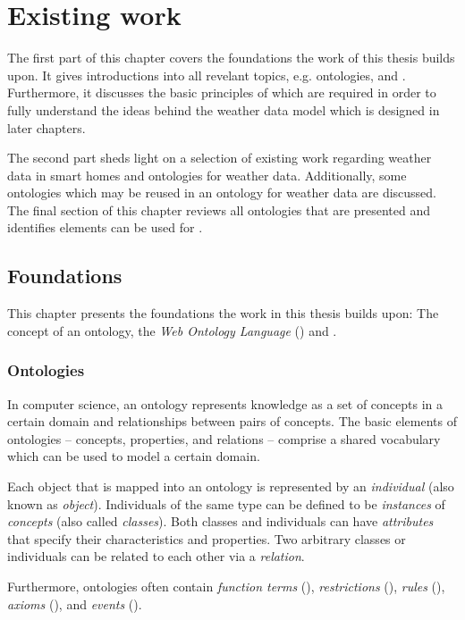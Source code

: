 \chapter{Existing work}
\label{ch:existing_work}

The first part of this chapter covers the foundations the work of this thesis builds upon. It gives introductions into all revelant topics, e.g. ontologies,  and . Furthermore, it discusses the basic principles of \thinkhome which are required in order to fully understand the ideas behind the weather data model which is designed in later chapters.

The second part sheds light on a selection of existing work regarding weather data in smart homes and ontologies for weather data. Additionally, some ontologies which may be reused in an ontology for weather data are discussed. The final section of this chapter reviews all ontologies that are presented and identifies elements can be used for \thinkhome.

\section{Foundations}

This chapter presents the foundations the work in this thesis builds upon: The concept of an ontology, the \emph{Web Ontology Language} () and \thinkhome.

\subsection{Ontologies}

In computer science, an ontology represents knowledge as a set of concepts in a certain domain and relationships between pairs of concepts. The basic elements of ontologies -- concepts, properties, and relations -- comprise a shared vocabulary which can be used to model a certain domain.

Each object that is mapped into an ontology is represented by an \emph{individual} (also known as \emph{object}). Individuals of the same type can be defined to be \emph{instances} of \emph{concepts} (also called \emph{classes}). Both classes and individuals can have \emph{attributes} that specify their characteristics and properties. Two arbitrary classes or individuals can be related to each other via a \emph{relation}.

Furthermore, ontologies often contain \emph{function terms} (), \emph{restrictions} (), \emph{rules} (), \emph{axioms} (), and \emph{events} ().

